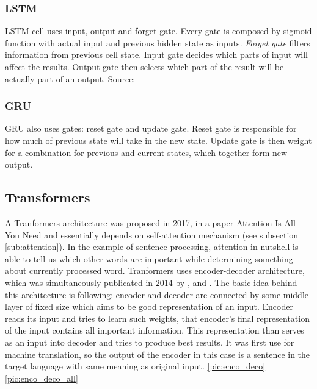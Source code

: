 \subsubsection*{LSTM} LSTM cell uses input, output and forget gate. Every gate is composed by sigmoid function with actual input and previous hidden state as inputs.
\textit{Forget gate} filters information from previous cell state. Input gate decides which parts of input will affect the results. Output gate then selects which part of the result will be actually part of an output. Source: \textit{\citep{rnn_paper}}%
\subsubsection*{GRU}
GRU also uses gates: reset gate and update gate. %
Reset gate is responsible for how much of previous state will take in the new state. Update gate is then weight for a combination for previous and current states, which together form new output.


\subsection{Transformers}
\label{sub:transformers}
A Tranformers architecture was proposed in 2017, in a paper Attention Is All You Need \citep{Vaswani2017} and essentially depends on self-attention mechanism (see subsection \ref{sub:attention}). In the example of sentence processing, attention in nutshell is able to tell us which other words are important while determining something about currently processed word.
Tranformers uses encoder-decoder architecture, which was simultaneously publicated in 2014 by \citep{Cho2014}, \citep{Sutskever2014} and \citep{Wu2016}. The basic idea behind this architecture is following: encoder and decoder are connected by some middle layer of fixed size which aims to be good representation of an input. Encoder reads its input and tries to learn such weights, that encoder's final representation of the input contains all important information. This representation than serves as an input into decoder and tries to produce best results. It was first use for machine translation, so the output of the encoder in this case is a sentence in the target language with same meaning as original input. 
\ref{pic:enco_deco}  \ref{pic:enco_deco_all} %

